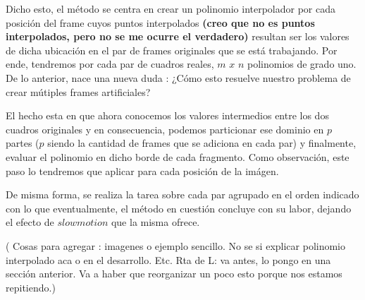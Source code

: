 Dicho esto, el m\'etodo se centra en crear un polinomio interpolador por cada posici\'on del frame cuyos puntos interpolados \textbf{(creo que no es puntos interpolados, pero no se me ocurre el verdadero)} resultan ser los valores de dicha ubicaci\'on en el par de frames originales que se est\'a trabajando. Por ende, tendremos por cada par de cuadros reales, $m$ $x$ $n$ polinomios de grado uno. De lo anterior, nace una nueva duda : ¿C\'omo esto resuelve nuestro problema de crear m\'utiples frames artificiales?

El hecho esta en que ahora conocemos los valores intermedios entre los dos cuadros originales y en consecuencia, podemos particionar ese dominio en $p$ partes ($p$ siendo la cantidad de frames que se adiciona en cada par) y finalmente, evaluar el polinomio en dicho borde de cada fragmento. Como observaci\'on, este paso lo tendremos que aplicar para cada posici\'on de la im\'agen.

De misma forma, se realiza la tarea sobre cada par agrupado en el orden indicado con lo que eventualmente, el m\'etodo en cuesti\'on concluye con su labor, dejando el efecto de $slowmotion$ que la misma ofrece.

( Cosas para agregar : imagenes o ejemplo sencillo. No se si explicar polinomio interpolado aca o en el desarrollo. Etc. Rta de L: va antes, lo pongo en una sección anterior. Va a haber que reorganizar un poco esto porque nos estamos repitiendo.) 
